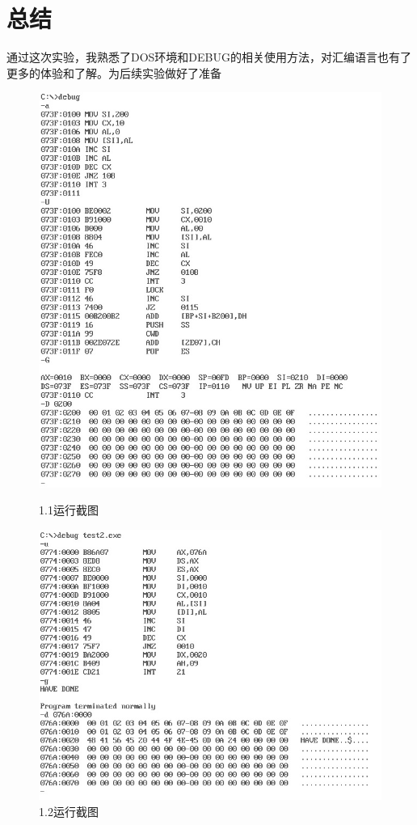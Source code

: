 \documentclass[UTF8,a4paper]{ctexart}
\begin{document}
\section{总结}
通过这次实验，我熟悉了DOS环境和DEBUG的相关使用方法，对汇编语言也有了更多的体验和了解。为后续实验做好了准备
\begin{figure}
\centering
\includegraphics[width=\textwidth]{1-2.jpg}
\caption{1.1运行截图}
\includegraphics[width=\textwidth]{1-3.jpg}
\caption{1.2运行截图}
\end{figure}
\end{document}
